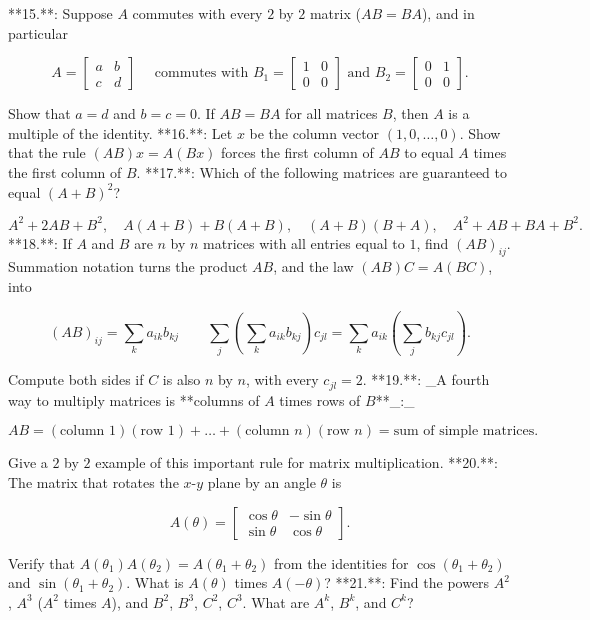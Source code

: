 

**15.**: Suppose \(A\) commutes with every \(2\) by \(2\) matrix (\(AB=BA\)), and in particular

\[A=\begin{bmatrix}a&b\\ c&d\end{bmatrix}\quad\text{ commutes with }B_{1}=\begin{bmatrix}1&0\\ 0&0\end{bmatrix}\text{ and }B_{2}=\begin{bmatrix}0&1\\ 0&0\end{bmatrix}.\]

Show that \(a=d\) and \(b=c=0\). If \(AB=BA\) for all matrices \(B\), then \(A\) is a multiple of the identity.
**16.**: Let \(x\) be the column vector \((1,0,\dots,0)\). Show that the rule \((AB)x=A(Bx)\) forces the first column of \(AB\) to equal \(A\) times the first column of \(B\).
**17.**: Which of the following matrices are guaranteed to equal \((A+B)^{2}\)?

\[A^{2}+2AB+B^{2},\quad A(A+B)+B(A+B),\quad(A+B)(B+A),\quad A^{2}+AB+BA+B^{2}.\]
**18.**: If \(A\) and \(B\) are \(n\) by \(n\) matrices with all entries equal to \(1\), find \((AB)_{ij}\). Summation notation turns the product \(AB\), and the law \((AB)C=A(BC)\), into

\[(AB)_{ij}=\sum_{k}a_{ik}b_{kj}\qquad\sum_{j}\left(\sum_{k}a_{ik}b_{kj}\right)c _{jl}=\sum_{k}a_{ik}\left(\sum_{j}b_{kj}c_{jl}\right).\]

Compute both sides if \(C\) is also \(n\) by \(n\), with every \(c_{jl}=2\).
**19.**: _A fourth way to multiply matrices is **columns of \(A\) times rows of \(B\)**_:_

\[AB=(\text{column }1)(\text{row }1)+\dots+(\text{column }n)(\text{row }n)=\text{sum of simple matrices}.\]

Give a \(2\) by \(2\) example of this important rule for matrix multiplication.
**20.**: The matrix that rotates the \(x\)-\(y\) plane by an angle \(\theta\) is

\[A(\theta)=\begin{bmatrix}\cos\theta&-\sin\theta\\ \sin\theta&\cos\theta\end{bmatrix}.\]

Verify that \(A(\theta_{1})A(\theta_{2})=A(\theta_{1}+\theta_{2})\) from the identities for \(\cos(\theta_{1}+\theta_{2})\) and \(\sin(\theta_{1}+\theta_{2})\). What is \(A(\theta)\) times \(A(-\theta)\)?
**21.**: Find the powers \(A^{2}\), \(A^{3}\) (\(A^{2}\) times \(A\)), and \(B^{2}\), \(B^{3}\), \(C^{2}\), \(C^{3}\). What are \(A^{k}\), \(B^{k}\), and \(C^{k}\)?

